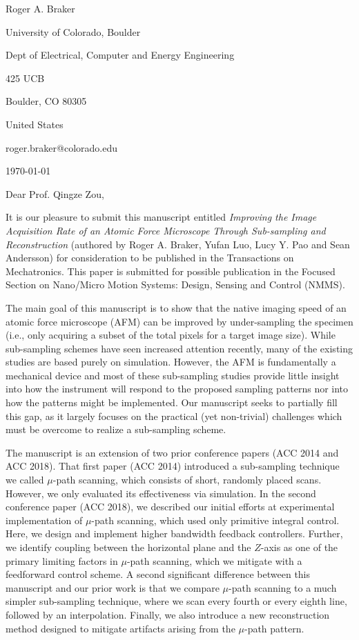 \documentclass[a4paper,twoside]{article}
\begin{document}
\hspace*{0.45\linewidth}
\begin{minipage}{0.52\linewidth}
Roger A. Braker\par
University of Colorado, Boulder\par
Dept of Electrical, Computer and Energy Engineering \par
425 UCB\par
Boulder, CO 80305\par
United States\par
roger.braker@colorado.edu\par
\today
\end{minipage}
\par\bigskip

Dear Prof. Qingze Zou,\par\bigskip

It is our pleasure to submit this manuscript entitled \textit{Improving the Image Acquisition Rate of an Atomic Force Microscope Through Sub-sampling and Reconstruction} (authored by Roger A. Braker, Yufan Luo, Lucy Y. Pao and Sean Andersson) for consideration to be published in the Transactions on Mechatronics. This paper is submitted for possible publication in the Focused Section on Nano/Micro Motion  Systems:  Design,  Sensing  and  Control (NMMS).

The main goal of this manuscript is to show that the native imaging speed of an atomic force microscope (AFM) can be improved by under-sampling the specimen (i.e., only acquiring a subset of the total pixels for a target image size). While sub-sampling schemes have seen increased attention recently, many of the existing studies are based purely on simulation. However, the AFM is fundamentally a mechanical device and most of these sub-sampling studies provide little insight
into how the instrument will respond to the proposed sampling patterns nor into how the patterns might be implemented. Our manuscript seeks to partially fill this gap, as it largely focuses on the practical (yet non-trivial) challenges which must be overcome to realize a sub-sampling scheme. 

The manuscript is an extension of two prior conference papers (ACC 2014 and ACC 2018). That first paper (ACC 2014) introduced a sub-sampling technique we called $\mu$-path scanning, which consists of short, randomly placed scans. However, we only evaluated its effectiveness via simulation. In the second conference paper (ACC 2018), we described our initial efforts at experimental implementation of $\mu$-path scanning, which used only primitive integral control. Here, we design and implement higher bandwidth feedback controllers. Further, we identify coupling between the horizontal plane and the $Z$-axis as one of the primary limiting factors in $\mu$-path scanning, which we mitigate with a feedforward control scheme. A second significant difference between this manuscript and our prior work is that we compare $\mu$-path scanning to a much simpler sub-sampling technique, where we scan every fourth or every eighth line, followed by an interpolation. Finally, we also introduce a new reconstruction method designed to mitigate artifacts arising from the $\mu$-path pattern.
\end{document}
